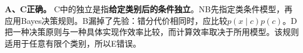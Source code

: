 \textbf{A、C正确。} C中的独立是指\textbf{给定类别后的条件独立}。NB先指定类条件模型，再应用Bayes决策规则。B漏掉了先验：错分代价相同时，应比较\(p(x\mid c)p(c)\)。D把一种决策原则与一种具体实现作效率比较，而计算效率取决于所用模型。该规则适用于任意有限个类别，所以E错误。
